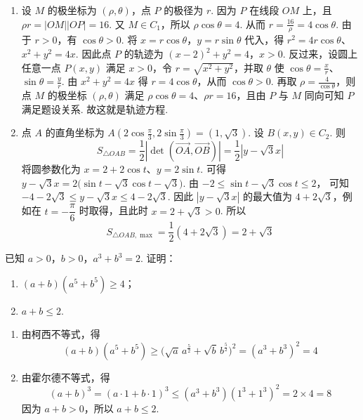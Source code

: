 \begin{solution}
\begin{enumerate}
\item 设 \(M\) 的极坐标为 \((\rho,\theta)\)，点 \(P\) 的极径为 \(r\). 因为 \(P\) 在线段 \(OM\) 上，且
\(\rho r=|OM||OP|=16\).
又 \(M\in C_1\)，所以 \(\rho\cos\theta=4\). 从而
\(r=\frac{16}{\rho}=4\cos\theta\).
由于 \(r>0\)，有 \(\cos\theta>0\). 将 \(x=r\cos\theta\)，\(y=r\sin\theta\) 代入，得
\(r^2=4r\cos\theta\)、\(x^2+y^2=4x\).
因此点 \(P\) 的轨迹为 \((x-2)^2+y^2=4\)，\(x>0\).
反过来，设圆上任意一点 \(P(x,y)\) 满足 \(x>0\)，令 \(r=\sqrt{x^2+y^2}\)，并取 \(\theta\) 使 \(\cos\theta=\frac{x}{r}\)、\(\sin\theta=\frac{y}{r}\). 由 \(x^2+y^2=4x\) 得 \(r=4\cos\theta\)，从而 \(\cos\theta>0\). 再取 \(\rho=\frac{4}{\cos\theta}\)，则点 \(M\) 的极坐标 \((\rho,\theta)\) 满足 \(\rho\cos\theta=4\)、\(\rho r=16\)，且由 \(P\) 与 \(M\) 同向可知 \(P\) 满足题设关系. 故这就是轨迹方程.

\item 点 \(A\) 的直角坐标为
\(A\left(2\cos\frac\pi3,2\sin\frac\pi3\right)=(1,\sqrt3)\).
设 \(B(x,y)\in C_2\). 则
\[
S_{\triangle OAB}=\frac12\left|\det(\overrightarrow{OA},\overrightarrow{OB})\right|
=\frac12|y-\sqrt3x|
\]
将圆参数化为
\(x=2+2\cos t\)、\(y=2\sin t\).
可得
\(y-\sqrt3x=2\bigl(\sin t-\sqrt3\cos t-\sqrt3\bigr)\).
由
\(-2\le\sin t-\sqrt3\cos t\le2\)，
可知
\(-4-2\sqrt3\le y-\sqrt3x\le4-2\sqrt3\).
因此 \(|y-\sqrt3x|\) 的最大值为 \(4+2\sqrt3\)，例如在 \(t=-\dfrac\pi6\) 时取得，且此时 \(x=2+\sqrt3>0\). 所以
\[
S_{\triangle OAB,\max}=\frac12(4+2\sqrt3)=2+\sqrt3
\]
\end{enumerate}
\end{solution}

\begin{problem}
已知 \(a>0\)，\(b>0\)，\(a^3+b^3=2\). 证明：

\begin{enumerate}
\item \((a+b)(a^5+b^5)\ge 4\)；
\item \(a+b\le 2\).
\end{enumerate}
\end{problem}

\begin{solution}
\begin{enumerate}
\item 由柯西不等式，得
\[
(a+b)(a^5+b^5)\ge\bigl(\sqrt a\,a^{\frac52}+\sqrt b\,b^{\frac52}\bigr)^2
=(a^3+b^3)^2=4
\]

\item 由霍尔德不等式，得
\[
(a+b)^3=(a\cdot1+b\cdot1)^3
\le(a^3+b^3)(1^3+1^3)^2=2\times4=8
\]
因为 \(a+b>0\)，所以 \(a+b\le2\).
\end{enumerate}
\end{solution}
